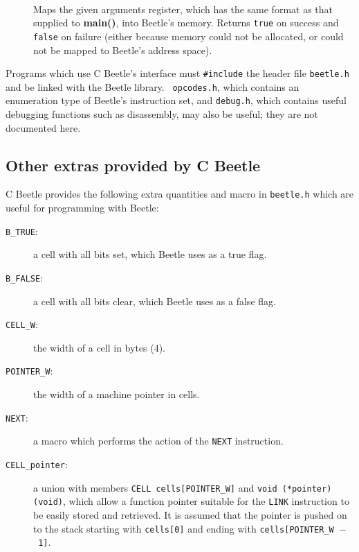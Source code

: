 \documentclass[english]{article}
\newlength{\ifacewidth}\ifacewidth=\textwidth \advance\ifacewidth by -0.1in
\newlength{\innerwidth}\innerwidth=\ifacewidth \advance\innerwidth by -0.5in
\newcommand{\ifacec}[2]{\item[]\parbox{\ifacewidth}{\hspace*{2.5mm}{\tt #1}\\[0.5ex]\hspace*{0.4in}\parbox{\innerwidth}{#2}}}
\begin{document}
\begin{description}
\ifacec{bool register\_args(int argc, char *argv[])}{Maps the given arguments register, which has the same format as that supplied to {\bf main()}, into Beetle’s memory. Returns {\tt true} on success and {\tt false} on failure (either because memory could not be allocated, or could not be mapped to Beetle’s address space).}
\end{description}

Programs which use C Beetle's interface must {\tt \#include} the header file
{\tt beetle.h} and be linked with the Beetle library. {\tt
opcodes.h}, which contains an enumeration type of Beetle's instruction set,
and {\tt debug.h}, which contains useful debugging functions such as
disassembly, may also be useful; they are not documented here.


\subsection{Other extras provided by C Beetle}

C Beetle provides the following extra quantities and macro in {\tt beetle.h}
which are useful for programming with Beetle:

\begin{description}
\item[{\tt B\_TRUE}:] a cell with all bits set, which Beetle uses as a true
flag.
\item[{\tt B\_FALSE}:] a cell with all bits clear, which Beetle uses as a
false flag.
\item[{\tt CELL\_W}:] the width of a cell in bytes (4).
\item[{\tt POINTER\_W}:] the width of a machine pointer in cells.
\item[{\tt NEXT}:] a macro which performs the action of the {\tt NEXT}
instruction.
\item[{\tt CELL\_pointer}:] a union with members {\tt CELL cells[POINTER\_W]} and {\tt void (*pointer)(void)}, which allow a function pointer suitable for the {\tt LINK} instruction to be easily stored and retrieved. It is assumed that the pointer is pushed on to the stack starting with {\tt cells[0]} and ending with {\tt cells[POINTER\_W~$-$~1]}.
\end{description}




\end{document}
